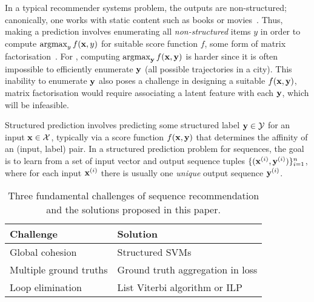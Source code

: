 In a typical recommender systems problem, the outputs are non-structured; canonically, one works with {static} content such as books or movies~\citep{Goldberg:1992,Sarwar:2001,Netflix}.
Thus, making a prediction involves enumerating all {\em non-structured} items $y$ in order to compute $\operatorname*{argmax}_y f(\mathbf{x},y)$ for suitable score function $f$, \eg some form of matrix factorisation~\citep{Koren:2009}.
For {\seqrec}, computing $\operatorname*{argmax}_{\mathbf{y}} f(\mathbf{x},\mathbf{y})$ is harder since it is often impossible to efficiently enumerate $\mathbf{y}$ (\eg all possible trajectories in a city).
This inability to enumerate $\mathbf{y}$ also poses a challenge in designing a suitable $f(\mathbf{x},\mathbf{y})$,
\eg
matrix factorisation
would require associating a latent feature with each $\mathbf{y}$, which will be infeasible.



Structured prediction involves predicting some structured label $\mathbf{y} \in \mathcal{Y}$ for an input $\mathbf{x} \in \mathcal{X}$,
typically via a score function $f(\mathbf{x},\mathbf{y})$ that determines the affinity of an (input, label) pair.
In a structured prediction problem for sequences, the goal is to learn from a set of input vector and output sequence tuples
$\{ (\mathbf{x}^{({i})}, \mathbf{y}^{({i})}) \}_{i = 1}^n$, where
for each input $\mathbf{x}^{({i})}$ there is usually one \emph{unique} output sequence $\mathbf{y}^{({i})}$.

\begin{table}[t]
	\centering
	\begin{tabular}{ll}
	\hline
	\hline
	{\bf Challenge}                    & {\bf Solution}                             \\ \hline
	Global cohesion                    & Structured SVMs                            \\ \hline
	Multiple ground truths             & Ground truth aggregation in loss 			\\ \hline
	Loop elimination                   & List Viterbi algorithm or ILP              \\ \hline
	\end{tabular}
	\caption{Three fundamental challenges of sequence recommendation and the solutions proposed in this paper.}
	\label{tbl:challenges}
\end{table}

